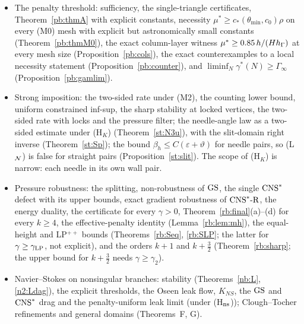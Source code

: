 \begin{itemize}
\item The penalty threshold: sufficiency, the single-triangle certificates, Theorem~\ref{pb:thmA} with explicit constants, necessity $\mu^\ast\ge c_\ast(\theta_{\min},c_0)\rho$ on every (M0) mesh with explicit but astronomically small constants (Theorem~\ref{pb:thmM0}), the exact column-layer witness $\mu^\ast\ge0.85\,h/(Hh_\Gamma)$ at every mesh size (Proposition~\ref{pb:cols}), the exact counterexamples to a local necessity statement (Proposition~\ref{pb:counter}), and $\liminf_N\gamma^\ast(N)\ge\Gamma_\infty$ (Proposition~\ref{pb:gamlim}).
\item Strong imposition: the two-sided rate under (M2), the counting lower bound, uniform constrained inf-sup, the sharp stability at locked vertices, the two-sided rate with locks and the pressure filter; the needle-angle law as a two-sided estimate under (H$_K$) (Theorem~\ref{st:N3u}), with the slit-domain right inverse (Theorem~\ref{st:Sp}); the bound $\beta_h\le C(\varepsilon+\vartheta)$ for needle pairs, so (L$_\mathcal N$) is false for straight pairs (Proposition~\ref{st:slit}). The scope of (H$_K$) is narrow: each needle in its own wall pair.
\item Pressure robustness: the splitting, non-robustness of $\mathrm{GS}$, the single $\mathrm{CNS}^\ast$ defect with its upper bounds, exact gradient robustness of $\mathrm{CNS}^\ast\text{-R}$, the energy duality, the certificate for every $\gamma>0$, Theorem~\ref{rb:final}(a)--(d) for every $k\ge4$, the effective-penalty identity (Lemma~\ref{rb:lem:mh}), the equal-height and LP$^{++}$ bounds (Theorems~\ref{rb:Seq}, \ref{rb:SLP}; the latter for $\gamma\ge\gamma_{\rm LP}$, not explicit), and the orders $k+1$ and $k+\frac32$ (Theorem~\ref{rb:sharp}; the upper bound for $k+\frac32$ needs $\gamma\ge\gamma_2$).
\item Navier--Stokes on nonsingular branches: stability (Theorems~\ref{nb:L}, \ref{n2:Ldag}), the explicit thresholds, the Oseen leak flow, $K_{NS}$, the $\mathrm{GS}$ and $\mathrm{CNS}^\ast$ drag and the penalty-uniform leak limit (under (H$_{\rm ns}$)); Clough--Tocher refinements and general domains (Theorems~F, G).
\end{itemize}

